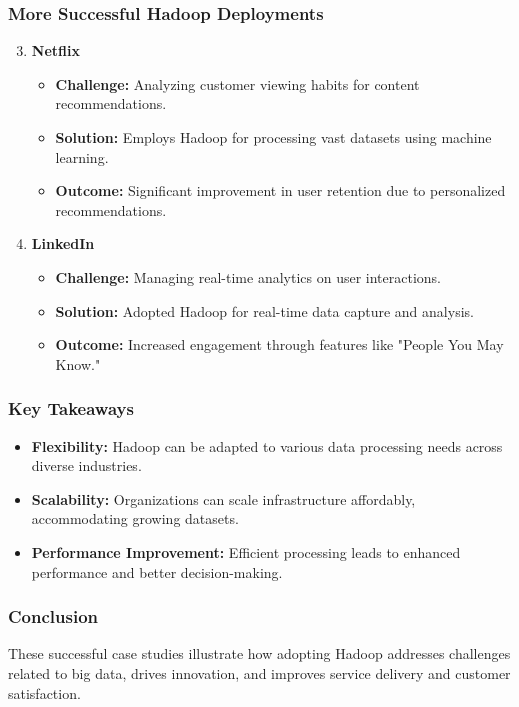 \documentclass[aspectratio=169]{beamer}
\begin{document}
\begin{frame}[fragile]
  \frametitle{More Successful Hadoop Deployments}
  \begin{enumerate}
    \setcounter{enumi}{2}
    \item \textbf{Netflix}
      \begin{itemize}
        \item \textbf{Challenge:} Analyzing customer viewing habits for content recommendations.
        \item \textbf{Solution:} Employs Hadoop for processing vast datasets using machine learning.
        \item \textbf{Outcome:} Significant improvement in user retention due to personalized recommendations.
      \end{itemize}

    \item \textbf{LinkedIn}
      \begin{itemize}
        \item \textbf{Challenge:} Managing real-time analytics on user interactions.
        \item \textbf{Solution:} Adopted Hadoop for real-time data capture and analysis.
        \item \textbf{Outcome:} Increased engagement through features like "People You May Know."
      \end{itemize}
  \end{enumerate}
\end{frame}

\begin{frame}[fragile]
  \frametitle{Key Takeaways}
  \begin{itemize}
    \item \textbf{Flexibility:} Hadoop can be adapted to various data processing needs across diverse industries.
    \item \textbf{Scalability:} Organizations can scale infrastructure affordably, accommodating growing datasets.
    \item \textbf{Performance Improvement:} Efficient processing leads to enhanced performance and better decision-making.
  \end{itemize}
\end{frame}

\begin{frame}[fragile]
  \frametitle{Conclusion}
  These successful case studies illustrate how adopting Hadoop addresses challenges related to big data, drives innovation, and improves service delivery and customer satisfaction.
\end{frame}
\end{document}

